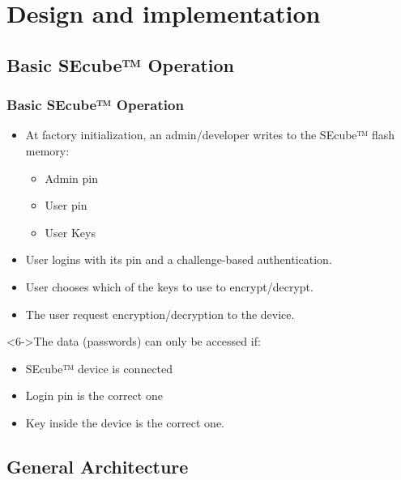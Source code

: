 \documentclass[14pt,usenames,dvipsnames]{beamer}
\begin{document}

\section{Design and implementation}

\subsection{Basic SEcube™ Operation}

\begin{frame}
	\frametitle{Basic SEcube™ Operation}
{\fontsize{13pt}{14}\selectfont	
	\begin{itemize}
	\setlength\itemsep{10pt}
	 \item<2-> At factory initialization, an admin/developer writes to the SEcube™ flash memory:
	   \begin{itemize}
	   	
	     \item<2-> {\fontsize{12pt}{14}\selectfont Admin pin}
	     \item<2-> {\fontsize{12pt}{14}\selectfont User pin}
	     \item<2-> {\fontsize{12pt}{14}\selectfont User Keys}
	   \end{itemize}
	 \item<3-> User logins with its pin and a challenge-based authentication.
	 \item<4-> User chooses which of the keys to use to encrypt/decrypt.	  
	 \item<5-> The user request encryption/decryption to the device.
	\end{itemize}
	
\begin{alertblock}<6->{The data (passwords) can only be accessed if:}
 \begin{itemize}
       \setlength\itemsep{0pt}
	     \item<2-> SEcube™ device is connected
	     \item<2-> Login pin is the correct one
	     \item<2-> Key inside the device is the correct one.
	   \end{itemize}
\end{alertblock}	
}	
\end{frame}

\subsection{General Architecture}
\end{document}
